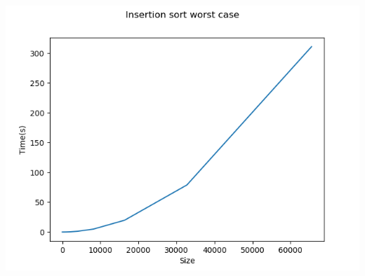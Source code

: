 \documentclass[]{article}
\begin{document}
\begin{center}
\includegraphics[scale=0.5]{InsertionSortWorstCase}\\
\end{center}
\end{document}
